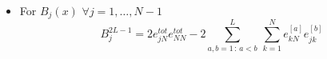 \documentclass[10pt]{article}
\numberwithin{equation}{section}
\numberwithin{equation}{subsection}
\begin{document}
\begin{itemize}
\item For $B_{j}(x)$  $\forall j=1,\ldots,N-1$ 
\begin{equation}\label{B-charge}
		B_{j}^{2L-1}=	2e_{jN}^{tot}e_{NN}^{tot}-2\sum_{a,b=1\,:\, a<b}^{L}\,\sum_{k=1}^{N}e_{kN}^{[a]} e_{jk}^{[b]}
\end{equation}

\end{itemize}
\end{document}
